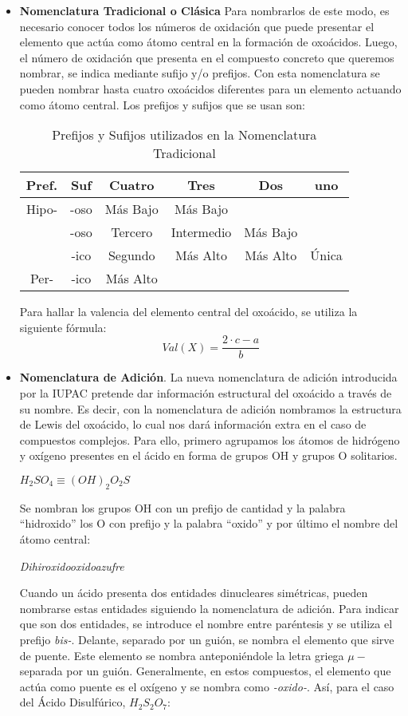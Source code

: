 \begin{itemize}
	\item \textbf{Nomenclatura Tradicional o Clásica} Para nombrarlos de este modo, es necesario conocer todos los números de oxidación que
	puede presentar el elemento que actúa como átomo central en la formación de oxoácidos.
	Luego, el número de oxidación que presenta en el compuesto concreto que queremos
	nombrar, se indica mediante sufijo y/o prefijos. Con esta nomenclatura se pueden nombrar hasta cuatro oxoácidos diferentes para un elemento actuando como átomo central. Los prefijos y sufijos que se usan son:\\
	\begin{table} [h!]
		\centering
		\begin{tabular}{c|c||c|c|c|c} \hline
			Pref.&Suf&Cuatro&Tres&Dos&uno\\ \hline
			Hipo-&-oso&Más Bajo&Más Bajo&&\\ \hline
			&-oso&Tercero&Intermedio&Más Bajo&\\ \hline
			&-ico&Segundo&Más Alto&Más Alto&Única\\ \hline
			Per-&-ico&Más Alto&&&\\ \hline
		\end{tabular}
		\caption{Prefijos y Sufijos utilizados en la Nomenclatura Tradicional}
	\end{table}
	Para hallar la valencia del elemento central del oxoácido, se utiliza la siguiente fórmula:
	\begin{equation}
		Val(X)=\frac{2\cdot c-a}{b}
	\end{equation}
	\item \textbf{Nomenclatura de Adición}. La nueva nomenclatura de adición introducida por la IUPAC pretende dar información estructural del oxoácido a través de su nombre. Es decir, con la nomenclatura de adición nombramos la estructura de Lewis del oxoácido, lo cual nos dará información extra en el caso de compuestos complejos. Para ello, primero agrupamos los átomos de hidrógeno y oxígeno presentes en el ácido en forma de grupos OH y grupos O solitarios.
	\begin{center}
		$H_{2}SO_{4}  \equiv (OH)_{2}O_{2}S$
	\end{center}
	Se nombran los grupos OH con un prefijo de cantidad y la palabra “hidroxido” los O con prefijo y la palabra “oxido” y por último el nombre del átomo central:
	\begin{center}
		\textit{Dihiroxidooxidoazufre}
	\end{center}
	Cuando un ácido presenta dos entidades dinucleares simétricas, pueden nombrarse estas entidades siguiendo la nomenclatura de adición. Para indicar que son dos entidades, se introduce el nombre entre paréntesis y se utiliza el prefijo \emph{bis-}. Delante, separado por un guión, se nombra el elemento que sirve de puente. Este elemento se nombra anteponiéndole la letra griega \emph{$\mu -$} separada por un guión. Generalmente, en estos compuestos, el elemento que actúa como puente es el oxígeno y se nombra como \emph{-oxido-}. Así, para el caso del Ácido Disulfúrico, $H_{2}S_{2}O_{7}$:

\end{itemize}

